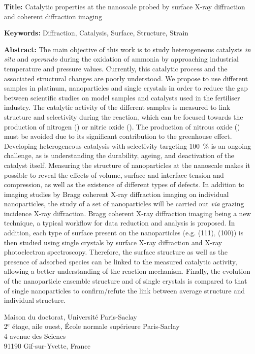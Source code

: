 \begin{mdframed}[linecolor=Prune,linewidth=1]

\textbf{Title:} Catalytic properties at the nanoscale probed by surface X-ray diffraction and coherent diffraction imaging

\noindent \textbf{Keywords:} Diffraction, Catalysis, Surface, Structure, Strain

\begin{multicols}{2}
\noindent \textbf{Abstract:}
The main objective of this work is to study heterogeneous catalysts \textit{in situ} and \textit{operando} during the oxidation of ammonia by approaching industrial temperature and pressure values.
Currently, this catalytic process and the associated structural changes are poorly understood.
We propose to use different samples in platinum, nanoparticles and single crystals in order to reduce the gap between scientific studies on model samples and catalysts used in the fertiliser industry.
The catalytic activity of the different samples is measured to link structure and selectivity during the reaction, which can be focused towards the production of nitrogen () or nitric oxide ().
The production of nitrous oxide () must be avoided due to its significant contribution to the greenhouse effect.
Developing heterogeneous catalysis with selectivity targeting \qty{100}{\percent} is an ongoing challenge, as is understanding the durability, ageing, and deactivation of the catalyst itself.
Measuring the structure of nanoparticles at the nanoscale makes it possible to reveal the effects of volume, surface and interface tension and compression, as well as the existence of different types of defects.
In addition to imaging studies by Bragg coherent X-ray diffraction imaging on individual nanoparticles, the study of a set of nanoparticles will be carried out \textit{via} grazing incidence X-ray diffraction.
Bragg coherent X-ray diffraction imaging being a new technique, a typical workflow for data reduction and analysis is proposed.
In addition, each type of surface present on the nanoparticles (e.g. (111), (100)) is then studied using single crystals by surface X-ray diffraction and X-ray photoelectron spectroscopy.
Therefore, the surface structure as well as the presence of adsorbed species can be linked to the measured catalytic activity, allowing a better understanding of the reaction mechanism.
Finally, the evolution of the nanoparticle ensemble structure and of single crystals is compared to that of single nanoparticles to confirm/refute the link between average structure and individual structure.
\end{multicols}
\end{mdframed}

\vspace{\fill} %

\noindent
\color{Prune} \footnotesize Maison du doctorat, Université Paris-Saclay\\
2$^{\mathrm{e}}$ étage, aile ouest, École normale supérieure Paris-Saclay\\
4 avenue des Sciencs\\
91190 Gif-sur-Yvette, France